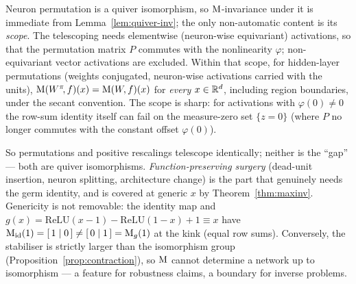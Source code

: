 \begin{proposition}\label{prop:perm}
Neuron permutation is a quiver isomorphism, so $\mathrm{M}$-invariance under it is
immediate from Lemma~\ref{lem:quiver-inv}; the only non-automatic content is its
\emph{scope}. The telescoping needs elementwise (neuron-wise equivariant)
activations, so that the permutation matrix $P$ commutes with the nonlinearity
$\varphi$; non-equivariant vector activations are excluded. Within that scope,
for hidden-layer permutations (weights conjugated, neuron-wise activations
carried with the units), $\mathrm{M}(W^\pi\!,f)(x)=\mathrm{M}(W\!,f)(x)$ for \emph{every}
$x\in\mathbb{R}^d$, including region boundaries, under the secant convention. The scope
is sharp: for activations with $\varphi(0)\neq0$ the row-sum identity itself can
fail on the measure-zero set $\{z=0\}$ (where $P$ no longer commutes with the
constant offset $\varphi(0)$).
\end{proposition}


So permutations and positive rescalings telescope identically; neither is the
``gap'' --- both are quiver isomorphisms. \emph{Function-preserving surgery}
(dead-unit insertion, neuron splitting, architecture change) is the part that
genuinely needs the germ identity, and is covered at generic $x$ by
Theorem~\ref{thm:maxinv}. Genericity is not removable: the
identity map and $g(x)=\mathrm{ReLU}(x-1)-\mathrm{ReLU}(1-x)+1\equiv x$ have
$\mathrm{M}_{\mathrm{id}}(1)=[\,1\mid 0\,]\neq[\,0\mid 1\,]=\mathrm{M}_g(1)$ at the kink (equal
row sums).  Conversely, the stabiliser is strictly larger than the isomorphism
group (Proposition~\ref{prop:contraction}), so $\mathrm{M}$ cannot determine a network
up to isomorphism --- a feature for robustness claims, a boundary for inverse
problems.


